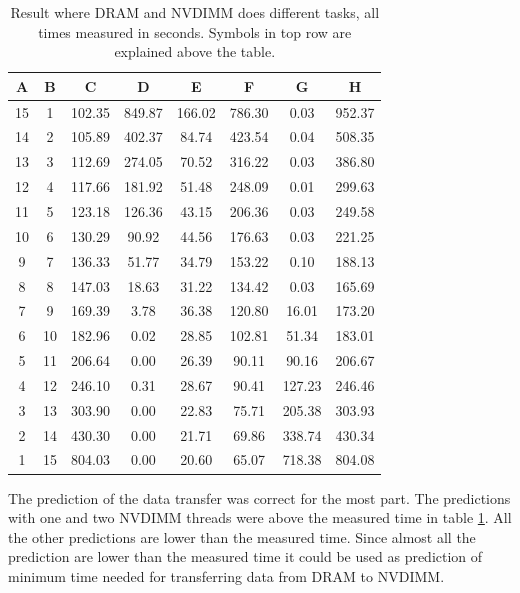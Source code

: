 \documentclass[12pt,a4paper,USenglish]{article}      %
\begin{document}
\begin{table}[!hbtp]
\centering
\begin{tabular}{ |c|c|c|c|c|c|c|c| } 
\hline
A & B & C & D & E & F & G & H \\
\hline
15 & 1 & 102.35 & 849.87 & 166.02 & 786.30 & 0.03 & 952.37 \\
\hline
14 & 2 & 105.89 & 402.37 & 84.74 & 423.54 & 0.04 & 508.35 \\
\hline
13 & 3 & 112.69 & 274.05 & 70.52 & 316.22 & 0.03 & 386.80 \\
\hline
12 & 4 & 117.66 & 181.92 & 51.48 & 248.09 & 0.01 & 299.63 \\
\hline
11 & 5 & 123.18 & 126.36 & 43.15 & 206.36 & 0.03 & 249.58 \\
\hline
10 & 6 & 130.29 & 90.92 & 44.56 & 176.63 & 0.03 & 221.25 \\
\hline
9 & 7 & 136.33 & 51.77 & 34.79 & 153.22 & 0.10 & 188.13 \\
\hline
8 & 8 & 147.03 & 18.63 & 31.22 & 134.42 & 0.03 & 165.69 \\
\hline
7 & 9 & 169.39 & 3.78 & 36.38 & 120.80 & 16.01 & 173.20 \\
\hline
6 & 10 & 182.96 & 0.02 & 28.85 & 102.81 & 51.34 & 183.01 \\
\hline
5 & 11 & 206.64 & 0.00 & 26.39 & 90.11 & 90.16 & 206.67 \\
\hline
4 & 12 & 246.10 & 0.31 & 28.67 & 90.41 & 127.23 & 246.46 \\
\hline
3 & 13 & 303.90 & 0.00 & 22.83 & 75.71 & 205.38 & 303.93 \\
\hline
2 & 14 & 430.30 & 0.00 & 21.71 & 69.86 & 338.74 & 430.34 \\
\hline
1 & 15 & 804.03 & 0.00 & 20.60 & 65.07 & 718.38 & 804.08 \\
\hline
\end{tabular}
\caption{Result where DRAM and NVDIMM does different tasks, all times measured in seconds. Symbols in top row are explained above the table.}
\label{tab:NVMresults}
\end{table}

The prediction of the data transfer was correct for the most part. The predictions with one and two NVDIMM threads were above the measured time in table \ref{tab:NVMresults}. All the other predictions are lower than the measured time. Since almost all the prediction are lower than the measured time it could be used as prediction of minimum time needed for transferring data from DRAM to NVDIMM.

\end{document}

